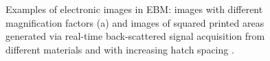 \begin{figure}
    \centering
    \qquad
    \caption[Co-axial sensing result.]{Examples of electronic images in EBM: images with different magnification factors (a) \cite{wong_pilot_2019} and images of squared printed areas generated via real-time back-scattered signal acquisition from different materials and with increasing hatch spacing \cite{arnold_operando_2020}.}
\end{figure}

